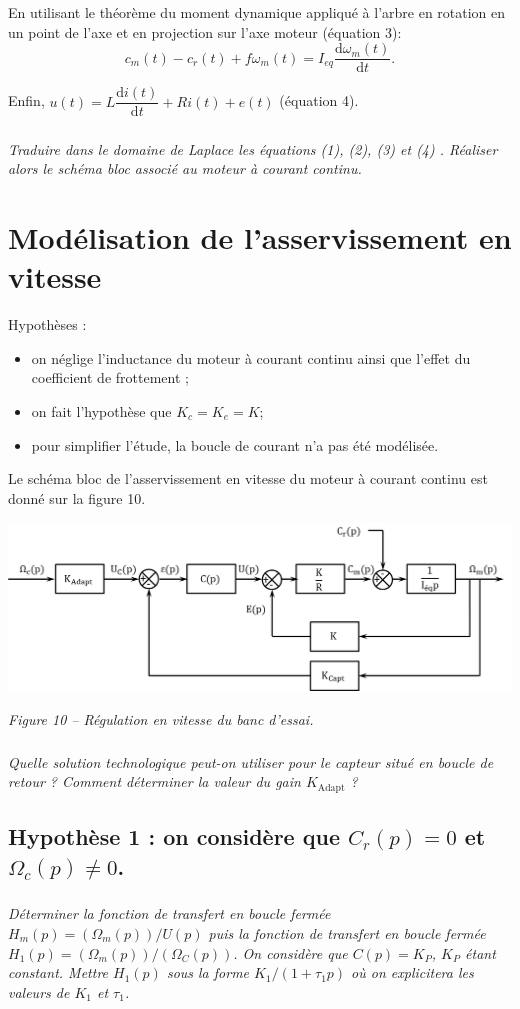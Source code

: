 \documentclass[10pt,fleqn]{article} %
\begin{document}
\begin{multicols}{2}
En utilisant le théorème du moment dynamique appliqué à l'arbre en rotation en un point de l'axe et en projection sur l'axe moteur (équation 3):
$$
c_m(t)-c_r(t)+f\omega_m(t) = I_{eq} \dfrac{\text{d} \omega_m(t)}{\text{d}t}.
$$

Enfin, $u(t)=L\dfrac{\text{d}i(t)}{\text{d}t}+Ri(t)+e(t)$ (équation 4).

\subparagraph{}\textit{Traduire dans le domaine de Laplace les équations (1), (2), (3) et (4) . Réaliser alors le schéma bloc associé au moteur à courant continu.}

\section*{Modélisation de l'asservissement en vitesse}
Hypothèses :
\begin{itemize}
\item on néglige l'inductance du moteur à courant continu ainsi que l'effet du coefficient de frottement ;
\item on fait l'hypothèse que $K_c=K_e =K$;
\item pour simplifier l'étude, la boucle de courant n'a pas été modélisée.
\end{itemize}
Le schéma bloc de l'asservissement en vitesse du moteur à courant continu est donné sur la figure 10.
 

\begin{center}
\includegraphics[width=\linewidth]{images/fig_06}

\textit{Figure 10 -- Régulation en vitesse du banc d'essai.}
\end{center}

\subparagraph{}\textit{Quelle solution technologique peut-on utiliser pour le capteur situé en boucle de retour ? Comment déterminer la valeur du gain $K_{\text{Adapt}}$ ?}

\subsection*{Hypothèse 1 : on considère que $C_r (p)=0$ et $\Omega_c (p)\neq 0$.}
\subparagraph{}\textit{Déterminer la fonction de transfert en boucle fermée $H_m (p)=(\Omega_m (p))/U(p)$ puis la fonction de transfert en boucle fermée $H_1 (p)=(\Omega_m (p))/(\Omega_C (p))$. On considère que $C(p)=K_P$, $K_P$ étant constant. Mettre $H_1 (p)$ sous la forme $K_1/(1+\tau_1 p)$ où on explicitera les valeurs de $K_1$ et $\tau_1$.}


\end{multicols}
\end{document}
